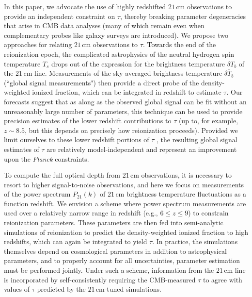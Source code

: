\documentclass[twocolumn,aps,prd,nofootinbib,showpacs,superscriptaddress]{revtex4-1}
\begin{document}
In this paper, we advocate the use of highly redshifted $21\,\textrm{cm}$ observations to provide an independent constraint on $\tau$, thereby breaking parameter degeneracies that arise in CMB data analyses (many of which remain even when complementary probes like galaxy surveys are introduced). We propose two approaches for relating $21\,\textrm{cm}$ observations to $\tau$. Towards the end of the reionization epoch, the complicated astrophysics of the neutral hydrogen spin temperature $T_s$ drops out of the expression for the brightness temperature $\delta T_b$ of the $21\,\textrm{cm}$ line. Measurements of the sky-averaged brightness temperature $\overline{\delta T_b}$ (``global signal measurements") then provide a direct probe of the density-weighted ionized fraction, which can be integrated in redshift to estimate $\tau$. Our forecasts suggest that as along as the observed global signal can be fit without an unreasonably large number of parameters, this technique can be used to provide precision estimates of the lower redshift contributions to $\tau$ (up to, for example, $z \sim 8.5$, but this depends on precisely how reionization proceeds). Provided we limit ourselves to these lower redshift portions of $\tau$
, the resulting global signal estimates of $\tau$ are relatively model-independent and represent an improvement upon the \emph{Planck} constraints.

To compute the full optical depth from $21\,\textrm{cm}$ observations, it is necessary to resort to higher signal-to-noise observations, and here we focus on measurements of the power spectrum $P_{21} (k)$ of $21\,\textrm{cm}$ brightness temperature fluctuations as a function redshift. We envision a scheme where power spectrum measurements are used over a relatively narrow range in redshift (e.g., $6 \le z \le 9$) to constrain reionization parameters. These parameters are then fed into semi-analytic simulations of reionization to predict the density-weighted ionized fraction to high redshifts, which can again be integrated to yield $\tau$. In practice, the simulations themselves depend on cosmological parameters in addition to astrophysical parameters, and to properly account for all uncertainties, parameter estimation must be performed jointly. Under such a scheme, information from the $21\,\textrm{cm}$ line is incorporated by self-consistently requiring the CMB-measured $\tau$ to agree with values of $\tau$ predicted by the $21\,\textrm{cm}$-tuned simulations.
\end{document}

